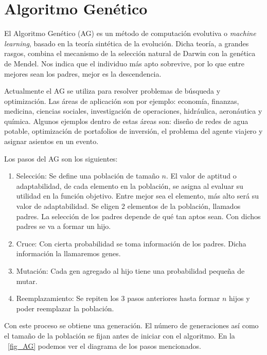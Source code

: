 \chapter{Algoritmo Genético}

El Algoritmo Genético (AG) es un método de computación evolutiva o \textit{machine learning}, basado en la teoría sintética de la evolución. Dicha teoría, a grandes rasgos, combina el mecanismo de la selección natural de Darwin con la genética de Mendel. Nos indica que el individuo más apto sobrevive, por lo que entre mejores sean los padres, mejor es la descendencia.

Actualmente el AG se utiliza para resolver problemas de búsqueda y optimización. Las áreas de aplicación son por ejemplo: economía, finanzas, medicina, ciencias sociales, investigación de operaciones, hidráulica, aeronáutica y química. Algunos ejemplos dentro de estas áreas son: diseño de redes de agua potable, optimización de portafolios de inversión, el problema del agente viajero y asignar asientos en un evento.

Los pasos del AG son los siguientes:

\begin{enumerate}
\item Selección: Se define una población de tamaño $n$. El valor de aptitud o adaptabilidad, de cada elemento en la población, se asigna al evaluar su utilidad en la función objetivo. Entre mejor sea el elemento, más alto será su valor de adaptabilidad. Se eligen 2 elementos de la población, llamados padres. La selección de los padres depende de qué tan aptos sean. Con dichos padres se va a formar un hijo.

\item Cruce: Con cierta probabilidad se toma información de los padres. Dicha información la llamaremos genes.

\item Mutación: Cada gen agregado al hijo tiene una probabilidad pequeña de mutar.

\item Reemplazamiento: Se repiten los 3 pasos anteriores hasta formar $n$ hijos y poder reemplazar la población.
\end{enumerate}

Con este proceso se obtiene una generación. El número de generaciones así como el tamaño de la población se fijan antes de iniciar con el algoritmo. En la \figurename{~\ref{fig_AG}} podemos ver el diagrama de los pasos mencionados.

